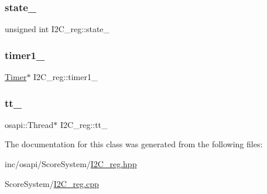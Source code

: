 \mbox{\label{class_i2_c__reg_a14b21c49054b5101a5b7258abbfcf7ec}} 
\subsubsection{\texorpdfstring{state\+\_\+}{state\_}}
{\footnotesize\ttfamily unsigned int I2\+C\+\_\+reg\+::state\+\_\+\hspace{0.3cm}{\ttfamily [private]}}

\mbox{\label{class_i2_c__reg_aaad6b1b2efeb974521239765556a18c8}} 
\subsubsection{\texorpdfstring{timer1\+\_\+}{timer1\_}}
{\footnotesize\ttfamily \hyperlink{class_timer}{Timer}$\ast$ I2\+C\+\_\+reg\+::timer1\+\_\+\hspace{0.3cm}{\ttfamily [private]}}

\mbox{\label{class_i2_c__reg_afaa9f5a61f18026faeb1cf499422ee04}} 
\subsubsection{\texorpdfstring{tt\+\_\+}{tt\_}}
{\footnotesize\ttfamily osapi\+::\+Thread$\ast$ I2\+C\+\_\+reg\+::tt\+\_\+\hspace{0.3cm}{\ttfamily [private]}}



The documentation for this class was generated from the following files\+:\begin{DoxyCompactItemize}
\item 
inc/osapi/\+Score\+System/\hyperlink{_i2_c__reg_8hpp}{I2\+C\+\_\+reg.\+hpp}\item 
Score\+System/\hyperlink{_i2_c__reg_8cpp}{I2\+C\+\_\+reg.\+cpp}\end{DoxyCompactItemize}
